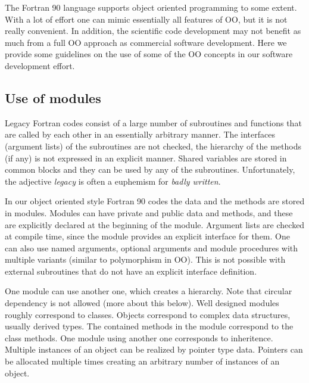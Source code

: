 \documentclass{article}
\begin{document}
The Fortran 90 language supports object oriented programming to some extent.
With a lot of effort one can mimic essentially all features of OO, but it is
not really convenient. In addition, the scientific code development 
may not benefit as much from a full OO approach as commercial software
development.
Here we provide some guidelines on the use of some of the OO concepts 
in our software development effort. 

\subsection{Use of modules}

Legacy Fortran codes consist of a large number of subroutines and functions
that are called by each other in an essentially arbitrary manner. The 
interfaces (argument lists) of the subroutines are not checked, the
hierarchy of the methods (if any) is not expressed in an explicit manner.
Shared variables are stored in common blocks and they can be used by any
of the subroutines. Unfortunately, the adjective {\it legacy} 
is often a euphemism for {\it badly written}.

In our object oriented style Fortran 90 codes the data and the methods are 
stored in modules. 
Modules can have private and public data and methods, and these are explicitly
declared at the beginning of the module. Argument lists are checked at compile
time, since the module provides an explicit interface for them. One can
also use named arguments, optional arguments and module procedures with
multiple variants (similar to polymorphism in OO). 
This is not possible with external subroutines that do
not have an explicit interface definition.

One module can use another one, which creates a hierarchy. 
Note that circular dependency is 
not allowed (more about this below). Well designed modules roughly correspond
to classes. Objects correspond to complex data structures, usually derived 
types. The contained methods in the module correspond to the class methods.
One module using another one corresponds to inheritence. Multiple instances
of an object can be realized by pointer type data. Pointers can be allocated
multiple times creating an arbitrary number of instances of an object.
\end{document}
